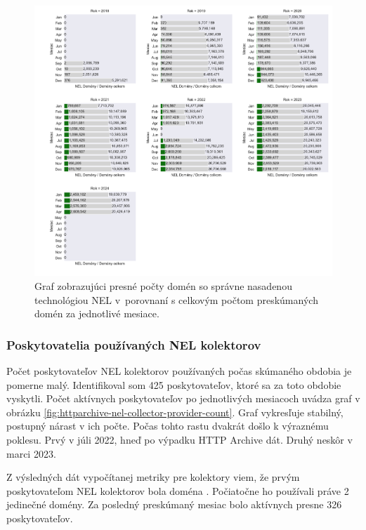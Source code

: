 \begin{figure}[!htb]
\begin{center}
 \includegraphics[scale=0.518]{obrazky-figures/httparchive_nel_deployment_ratio_values.pdf}
 \caption{Graf zobrazujúci presné počty domén so správne nasadenou technológiou NEL \mbox{v porovnaní} s celkovým počtom preskúmaných domén za jednotlivé mesiace.}
 \label{fig:httparchive-nel-deployment_ratio_values}
\end{center}
\end{figure}

\pagebreak


\subsubsection{Poskytovatelia používaných NEL kolektorov}

Počet poskytovateľov NEL kolektorov používaných počas skúmaného obdobia je pomerne malý.
Identifikoval som 425 poskytovateľov, ktoré sa za toto obdobie vyskytli.
Počet aktívnych poskytovateľov po jednotlivých mesiacoch uvádza graf v obrázku \ref{fig:httparchive-nel-collector-provider-count}.
Graf vykresľuje stabilný, postupný nárast v ich počte.
Počas tohto rastu dvakrát došlo k výraznému poklesu.
Prvý v júli 2022, hneď po výpadku HTTP Archive dát.
Druhý neskôr v marci 2023.

Z výsledných dát vypočítanej metriky pre kolektory viem, že prvým poskytovateľom NEL kolektorov bola doména .
Počiatočne ho používali práve 2 jedinečné domény.
Za posledný preskúmaný mesiac bolo aktívnych presne 326 poskytovateľov.

